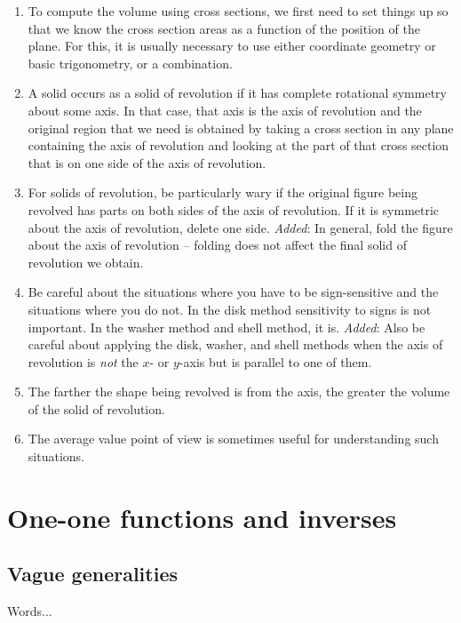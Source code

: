 \documentclass[10pt]{amsart}
\begin{document}
\begin{enumerate}
\item To compute the volume using cross sections, we first need to set
  things up so that we know the cross section areas as a function of
  the position of the plane. For this, it is usually necessary to use
  either coordinate geometry or basic trigonometry, or a combination.
\item A solid occurs as a solid of revolution if it has complete
  rotational symmetry about some axis. In that case, that axis is the
  axis of revolution and the original region that we need is obtained
  by taking a cross section in any plane containing the axis of
  revolution and looking at the part of that cross section that is on
  one side of the axis of revolution.
\item For solids of revolution, be particularly wary if the original
  figure being revolved has parts on both sides of the axis of
  revolution. If it is symmetric about the axis of revolution, delete
  one side. {\em Added}: In general, fold the figure about the axis of
  revolution -- folding does not affect the final solid of revolution
  we obtain.
\item Be careful about the situations where you have to be
  sign-sensitive and the situations where you do not. In the disk
  method sensitivity to signs is not important. In the washer method
  and shell method, it is. {\em Added}: Also be careful about applying
  the disk, washer, and shell methods when the axis of revolution is
  {\em not} the $x$- or $y$-axis but is parallel to one of them.
\item The farther the shape being revolved is from the axis, the
  greater the volume of the solid of revolution.
\item The average value point of view is sometimes useful for
  understanding such situations.
\end{enumerate}

\section{One-one functions and inverses}

\subsection{Vague generalities}

Words...
\end{document}
